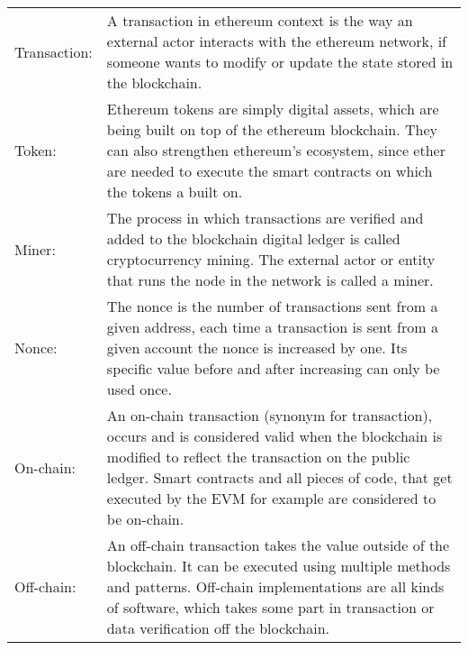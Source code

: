 \begin{center}
	\begin{tabular}{ p{4cm} p{8cm} }
		Transaction:  & A transaction in ethereum context is the way an external actor interacts with the ethereum network, if someone wants to modify or update the state stored in the blockchain. \\
		Token: & Ethereum tokens are simply digital assets, which are being built on top of the ethereum blockchain. They can also strengthen ethereum's ecosystem, since ether are needed to execute the smart contracts on which the tokens a built on. \\
		Miner: & The process in which transactions are verified and added to the blockchain digital ledger is called cryptocurrency mining. The external actor or entity that runs the node in the network is called a miner. \\
		Nonce: & The nonce is the number of transactions sent from a given address, each time a transaction is sent from a given account the nonce is increased by one. Its specific value before and after increasing can only be used once. \\
		On-chain: & An on-chain transaction (synonym for transaction), occurs and is considered valid when the blockchain is modified to reflect the transaction on the public ledger. Smart contracts and all pieces of code, that get executed by the \ac{EVM} for example are considered to be on-chain. \\
		Off-chain: & An off-chain transaction takes the value outside of the blockchain. It can be executed using multiple methods and patterns. Off-chain implementations are all kinds of software, which takes some part in transaction or data verification off the blockchain. \\
	\end{tabular}
\end{center}







